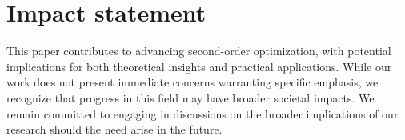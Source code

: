 \section*{Impact statement}
This paper contributes to advancing second-order optimization, with potential implications for both theoretical insights and practical applications. While our work does not present immediate concerns warranting specific emphasis, we recognize that progress in this field may have broader societal impacts. We remain committed to engaging in discussions on the broader implications of our research should the need arise in the future.


